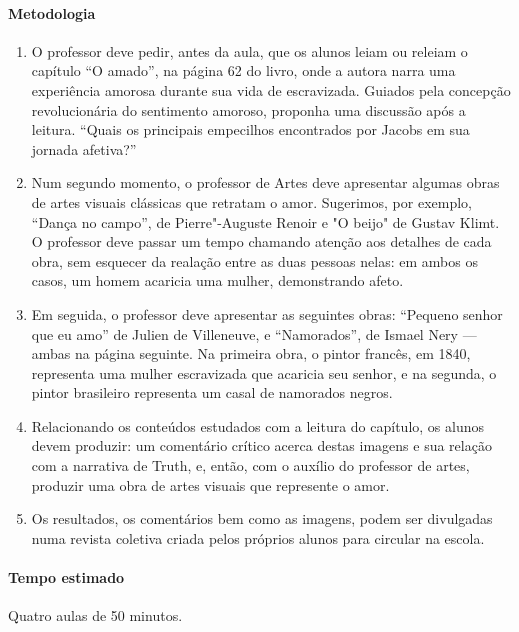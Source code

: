 \documentclass[11pt]{extarticle}
\begin{document}
 \paragraph{Metodologia}
   \begin{enumerate}
    \item
      O professor deve pedir, antes da aula, que os alunos leiam ou releiam 
      o capítulo ``O amado'', 
    na página 62 do livro, onde a autora narra uma experiência amorosa durante 
    sua vida de escravizada. Guiados pela concepção revolucionária do sentimento 
    amoroso, proponha uma discussão após a leitura. 
    ``Quais os principais empecilhos encontrados por Jacobs em sua jornada afetiva?''

    \item
    Num segundo momento, o professor de Artes deve apresentar algumas obras
    de artes visuais clássicas que retratam o amor. Sugerimos, por exemplo,
    ``Dança no campo'', de Pierre"-Auguste Renoir e "O beijo" de Gustav Klimt.
    O professor deve passar um tempo chamando atenção aos detalhes de cada 
    obra, sem esquecer da realação entre as duas pessoas nelas: em ambos
    os casos, um homem acaricia uma mulher, demonstrando afeto.

    \item
    Em seguida, o professor deve apresentar as seguintes obras: 
    ``Pequeno senhor que eu amo'' de Julien de Villeneuve, e ``Namorados'',
    de Ismael Nery --- ambas na página seguinte. Na primeira obra, o pintor francês, em 1840, representa 
    uma mulher escravizada que acaricia seu senhor, e na segunda, o pintor 
    brasileiro representa um casal de namorados negros. 

    \item
    Relacionando os conteúdos estudados com a leitura do capítulo, 
    os alunos devem produzir: um comentário crítico acerca destas imagens 
    e sua relação com a narrativa de Truth, e, então, com o auxílio do
    professor de artes, produzir uma obra de artes visuais que represente o amor. 

    \item
    Os resultados, os comentários bem como as imagens, podem ser divulgadas
    numa revista coletiva criada pelos próprios alunos para circular na escola. 
\end{enumerate}

 \paragraph{Tempo estimado} Quatro aulas de 50 minutos.
\end{document}
